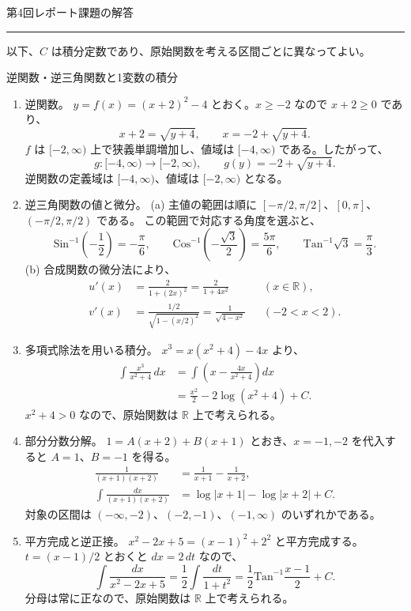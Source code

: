 \documentclass[a4paper,10pt,pdflatex,ja=standard,jafont=ipaex-type1,
  magstyle=real,scale=1]{bxjsarticle}
\newcommand{\coursename}{解析学 II}
\newcommand{\handouttitle}[1]{%
  \begin{center}
    {\Large\mdseries\color{ink}#1}\par\vspace{3mm}
    {\color{accent}\rule{0.88\linewidth}{0.7pt}}
  \end{center}\vspace{-2mm}}
\newcommand{\topic}[1]{\par\vspace{5pt}%
  {\large\sffamily\mdseries\color{accent}#1}\par\vspace{2pt}}
\newenvironment{problems}
  {\begin{enumerate}[leftmargin=2.4em,itemsep=3pt,topsep=3pt,parsep=0pt,
    font=\color{accent}]}
  {\end{enumerate}}
\newcommand{\problemlabel}[1]{{\sffamily\mdseries\color{ink}#1}}
\begin{document}
\clearpage
\fancyhead[L]{\small\color{ink}\coursename{}・レポート課題の解答}
\handouttitle{第4回\quad レポート課題の解答}
{\small 以下、$C$ は積分定数であり、原始関数を考える区間ごとに異なってよい。}\par
\topic{逆関数・逆三角関数と1変数の積分}
\begin{problems}
\setlength{\itemsep}{9pt}
\item \problemlabel{逆関数。}
$y=f(x)=(x+2)^2-4$ とおく。$x\ge-2$ なので $x+2\ge0$ であり、
$$
 x+2=\sqrt{y+4},\qquad x=-2+\sqrt{y+4}.
$$
$f$ は $[-2,\infty)$ 上で狭義単調増加し、値域は $[-4,\infty)$ である。したがって、
$$
 g\colon[-4,\infty)\longrightarrow[-2,\infty),\qquad
 g(y)=-2+\sqrt{y+4}.
$$
逆関数の定義域は $[-4,\infty)$、値域は $[-2,\infty)$ となる。

\item \problemlabel{逆三角関数の値と微分。}
(a) 主値の範囲は順に $[-\pi/2,\pi/2]$、$[0,\pi]$、$(-\pi/2,\pi/2)$ である。
この範囲で対応する角度を選ぶと、
$$
 \mathrm{Sin}^{-1}\left(-\frac12\right)=-\frac\pi6,\qquad
 \mathrm{Cos}^{-1}\left(-\frac{\sqrt3}{2}\right)=\frac{5\pi}6,\qquad
 \mathrm{Tan}^{-1}\sqrt3=\frac\pi3.
$$
(b) 合成関数の微分法により、
$$
 \begin{aligned}
 u'(x)&=\frac{2}{1+(2x)^2}=\frac{2}{1+4x^2}
 &&(x\in\mathbb R),\\
 v'(x)&=\frac{1/2}{\sqrt{1-(x/2)^2}}=\frac1{\sqrt{4-x^2}}
 &&(-2<x<2).
 \end{aligned}
$$

\item \problemlabel{多項式除法を用いる積分。}
$x^3=x(x^2+4)-4x$ より、
$$
 \begin{aligned}
 \int\frac{x^3}{x^2+4}\,dx
 &=\int\left(x-\frac{4x}{x^2+4}\right)dx\\
 &=\frac{x^2}{2}-2\log(x^2+4)+C.
 \end{aligned}
$$
$x^2+4>0$ なので、原始関数は $\mathbb R$ 上で考えられる。

\item \problemlabel{部分分数分解。}
$1=A(x+2)+B(x+1)$ とおき、$x=-1,-2$ を代入すると $A=1$、$B=-1$ を得る。
$$
 \begin{aligned}
 \frac1{(x+1)(x+2)}&=\frac1{x+1}-\frac1{x+2},\\
 \int\frac{dx}{(x+1)(x+2)}&=\log|x+1|-\log|x+2|+C.
 \end{aligned}
$$
対象の区間は $(-\infty,-2)$、$(-2,-1)$、$(-1,\infty)$ のいずれかである。

\item \problemlabel{平方完成と逆正接。}
$x^2-2x+5=(x-1)^2+2^2$ と平方完成する。$t=(x-1)/2$ とおくと $dx=2\,dt$ なので、
$$
 \int\frac{dx}{x^2-2x+5}
 =\frac12\int\frac{dt}{1+t^2}
 =\frac12\mathrm{Tan}^{-1}\frac{x-1}{2}+C.
$$
分母は常に正なので、原始関数は $\mathbb R$ 上で考えられる。
\end{problems}
\end{document}
